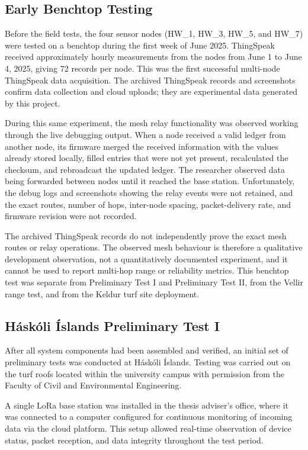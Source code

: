 \subsection{Early Benchtop Testing}\label{sec:benchtop-testing}

Before the field tests, the four sensor nodes (HW\_1, HW\_3, HW\_5, and HW\_7) were tested on a benchtop during the first week of June 2025. ThingSpeak received approximately hourly measurements from the nodes from June 1 to June 4, 2025, giving 72 records per node. This was the first successful multi-node ThingSpeak data acquisition. The archived ThingSpeak records and screenshots confirm data collection and cloud uploads; they are experimental data generated by this project.

During this same experiment, the mesh relay functionality was observed working through the live debugging output. When a node received a valid ledger from another node, its firmware merged the received information with the values already stored locally, filled entries that were not yet present, recalculated the checksum, and rebroadcast the updated ledger. The researcher observed data being forwarded between nodes until it reached the base station. Unfortunately, the debug logs and screenshots showing the relay events were not retained, and the exact routes, number of hops, inter-node spacing, packet-delivery rate, and firmware revision were not recorded.

The archived ThingSpeak records do not independently prove the exact mesh routes or relay operations. The observed mesh behaviour is therefore a qualitative development observation, not a quantitatively documented experiment, and it cannot be used to report multi-hop range or reliability metrics. This benchtop test was separate from Preliminary Test I and Preliminary Test II, from the Vellir range test, and from the Keldur turf site deployment.

\subsection{Háskóli Íslands Preliminary Test I}

After all system components had been assembled and verified, an initial set of preliminary tests was conducted at Háskóli Íslands. Testing was carried out on the turf roofs located within the university campus with permission from the Faculty of Civil and Environmental Engineering.

A single LoRa base station was installed in the thesis adviser's office, where it was connected to a computer configured for continuous monitoring of incoming data via the cloud platform. This setup allowed real-time observation of device status, packet reception, and data integrity throughout the test period.

